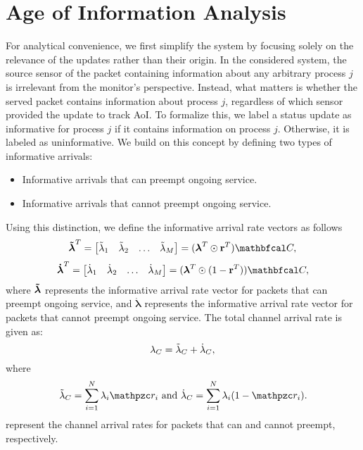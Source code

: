 \section{Age of Information Analysis} \label{aoi-S}





For analytical convenience, we first simplify the system by focusing solely on the relevance of the updates rather than their origin. In the considered system, the source sensor of the packet containing information about any arbitrary process $j$ is irrelevant from the monitor's perspective. Instead, what matters is whether the served packet contains information about process $j$, regardless of which sensor provided the update to track AoI. To formalize this, we label a status update as informative for process $j$ if it contains information on process $j$. Otherwise, it is labeled as uninformative. We build on this concept by defining two types of informative arrivals:
\begin{itemize}
    \item Informative arrivals that can preempt ongoing service.
    \item Informative arrivals that cannot preempt ongoing service.
\end{itemize}
Using this distinction, we define the informative arrival rate vectors as follows
\begin{equation}
\boldsymbol{\Tilde{\lambda}}^T = \begin{bmatrix}
\Tilde{\lambda}_{1} & \Tilde{\lambda}_{2} & \dots & \Tilde{\lambda}_{M}
\end{bmatrix} = (\boldsymbol{\lambda}^T \odot \bfp^T) \bfc,
\end{equation}
\begin{equation}
\boldsymbol{\dot{\lambda}}^T = \begin{bmatrix}
\dot{\lambda}_{1} & \dot{\lambda}_{2} & \dots & \dot{\lambda}_{M}
\end{bmatrix} = (\boldsymbol{\lambda}^T \odot (1-\bfp^T)) \bfc,
\end{equation}
%
where \(\boldsymbol{\Tilde{\lambda}}\) represents the informative arrival rate vector for packets that can preempt ongoing service, and \(\boldsymbol{\dot{\lambda}}\) represents the informative arrival rate vector for packets that cannot preempt ongoing service. The total channel arrival rate is given as:
\begin{equation}
\lambda_C = \Tilde{\lambda}_C + \dot{\lambda}_C,
\end{equation}
where
\begin{equation}
\Tilde{\lambda}_C = \sum_{i=1}^{N} \lambda_i \np_{i} \text{ and }
\dot{\lambda}_C = \sum_{i=1}^{N} \lambda_i (1 - \np_{i}).
\end{equation}
represent the channel arrival rates for packets that can and cannot preempt, respectively.

